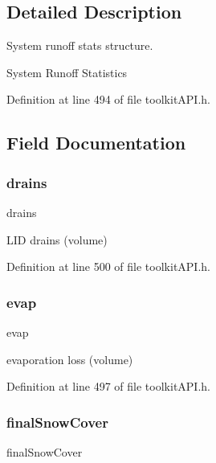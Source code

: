 \subsection{Detailed Description}
System runoff stats structure. 

System Runoff Statistics 

Definition at line 494 of file toolkit\+A\+P\+I.\+h.



\subsection{Field Documentation}
\mbox{\label{struct_s_m___runoff_totals_aee262996ca8263b6f94774a0c337ddb4}} 
\subsubsection{\texorpdfstring{drains}{drains}}
{\footnotesize\ttfamily drains}

L\+ID drains (volume) 

Definition at line 500 of file toolkit\+A\+P\+I.\+h.

\mbox{\label{struct_s_m___runoff_totals_aac3c1df7592191453d2ff02e5ff1b7e6}} 
\subsubsection{\texorpdfstring{evap}{evap}}
{\footnotesize\ttfamily evap}

evaporation loss (volume) 

Definition at line 497 of file toolkit\+A\+P\+I.\+h.

\mbox{\label{struct_s_m___runoff_totals_a50e84cf1314dcc39864c68c3ad316055}} 
\subsubsection{\texorpdfstring{final\+Snow\+Cover}{finalSnowCover}}
{\footnotesize\ttfamily final\+Snow\+Cover}

